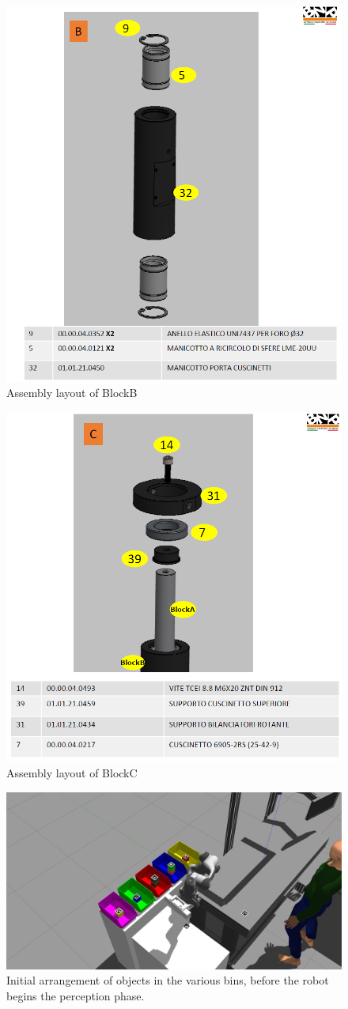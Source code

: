 \begin{figure} [!htbp]
\centering
\includegraphics[width=0.6
\textwidth]{figures/Magistrale/ass_obj_2}
\caption[BlockB Assembly]{Assembly layout of BlockB
\label{fig:ass_obj_2}}
\end{figure} 

\begin{figure} [!htbp]
\centering
\includegraphics[width=0.6
\textwidth]{figures/Magistrale/ass_obj_3}
\caption[BlockC Assembly]{Assembly layout of BlockC
\label{fig:ass_obj_3}}
\end{figure} 

\begin{figure} [!htbp]
\centering
\includegraphics[width=0.6
\textwidth]{figures/Magistrale/ass_1}
\caption[Initial Assembly Test Environment]{Initial arrangement of objects in the various bins, before the robot begins the perception phase.
\label{fig:ass_1}}
\end{figure} 

